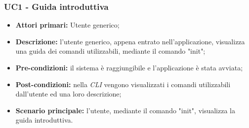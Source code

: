 \subsubsection{UC1 - Guida introduttiva}
\begin{itemize}
	\item \textbf{Attori primari:} Utente generico;
	\item \textbf{Descrizione:} l'utente generico, appena entrato nell'applicazione, visualizza una guida dei comandi utilizzabili, mediante il comando "init"; 
	\item \textbf{Pre-condizioni:} il sistema è raggiungibile e l'applicazione è stata avviata;
	\item \textbf{Post-condizioni:} nella \textit{CLI\glo} vengono visualizzati i comandi utilizzabili dall'utente ed una loro descrizione;
	\item \textbf{Scenario principale:} l'utente, mediante il comando "init", visualizza la guida introduttiva.
\end{itemize}